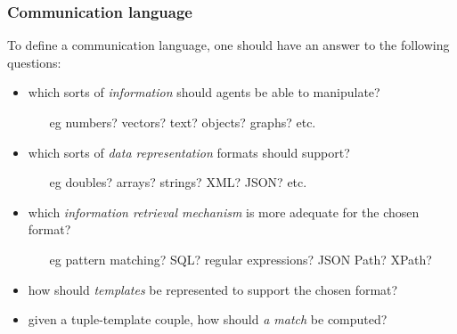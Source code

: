 \documentclass[presentation]{beamer}\mode<presentation>{\usetheme{AMSCesenaPurpleAndGold}}
\begin{document}
\begin{frame}%
	\frametitle{Communication language}
	
	To define a communication language, one should have an answer to the following questions:
	\vfill
	\begin{itemize}
		\item which sorts of \emph{information} should agents be able to manipulate?
		\begin{itemize}
			\item[eg] numbers? vectors? text? objects? graphs? etc.
		\end{itemize}
	
		\vfill
		
		\item which sorts of \emph{data representation} formats should \linda{} support?
		\begin{itemize}
			\item[eg] doubles? arrays? strings? XML? JSON? etc.
		\end{itemize}
	
		\vfill
		
		\item which \emph{information retrieval mechanism} is more adequate for the chosen format?
		\begin{itemize}
			\item[eg] pattern matching? SQL? regular expressions? JSON Path? XPath?
		\end{itemize}
	
		\vfill
		
		\item how should \emph{templates} be represented to support the chosen format?
		
		\vfill
		
		\item given a tuple-template couple, how should \emph{a match} be computed?
	\end{itemize}
	
\end{frame}
\end{document}

